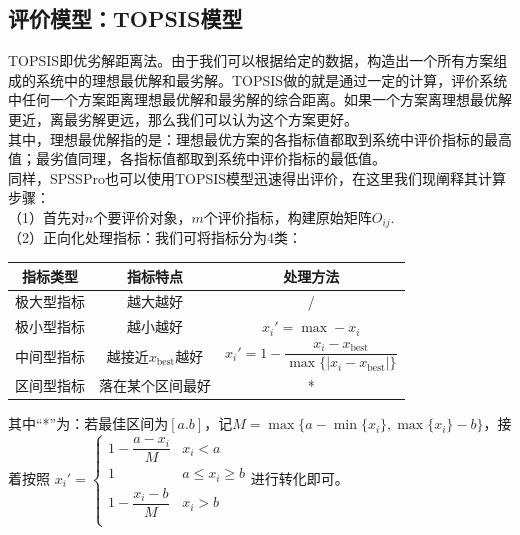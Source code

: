 \documentclass[11pt,a4paper]{article}
\begin{document}
\subsection{评价模型：TOPSIS模型}
TOPSIS即优劣解距离法。由于我们可以根据给定的数据，构造出一个所有方案组成的系统中的理想最优解和最劣解。TOPSIS做的就是通过一定的计算，评价系统中任何一个方案距离理想最优解和最劣解的综合距离。如果一个方案离理想最优解更近，离最劣解更远，那么我们可以认为这个方案更好。\\
其中，理想最优解指的是：理想最优方案的各指标值都取到系统中评价指标的最高值；最劣值同理，各指标值都取到系统中评价指标的最低值。\\
同样，SPSSPro也可以使用TOPSIS模型迅速得出评价，在这里我们现阐释其计算步骤：\\
（1）首先对$n$个要评价对象，$m$个评价指标，构建原始矩阵$O_{ij}$.\\
（2）正向化处理指标：我们可将指标分为4类：
\begin{table}[h]
	\centering
	\begin{tabular}{ccc}
		\hline
		指标类型& 指标特点 &处理方法 \\
		\hline
		极大型指标& 越大越好 & /\\
		极小型指标& 越小越好 & $x_i'=\max -x_i$ \\
		中间型指标& 越接近$x_{\mathrm{best}}$越好 &$x_i'=1-\dfrac{x_i-x_{\mathrm{best}}}{\max \{ |x_i-x_{\mathrm{best}}| \}}$ \\
		区间型指标& 落在某个区间最好 & * \\
		\hline
	\end{tabular}
\end{table}

\noindent 其中“*”为：若最佳区间为$[a.b]$，记$M=\max\{a-\min\{x_i\}, \max\{x_i\}-b \}$，接着按照
$x_i'=\begin{cases}
	1-\dfrac{a-x_i}{M} & x_i<a\\
	1 & a \le x_i \ge b\\
	1-\dfrac{x_i-b}{M} & x_i>b\\
\end{cases}$进行转化即可。\\
\end{document}
